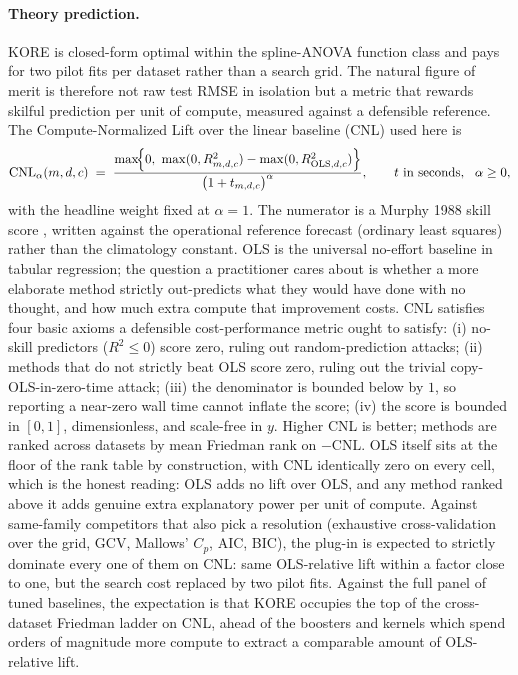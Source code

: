 \documentclass{article}
\newcommand{\KORE}{\textsc{KORE}}
\begin{document}
\paragraph{Theory prediction.}
\KORE{} is closed-form optimal within the spline-ANOVA function class and pays for two pilot fits per dataset rather than a search grid. The natural figure of merit is therefore not raw test RMSE in isolation but a metric that rewards skilful prediction per unit of compute, measured against a defensible reference. The Compute-Normalized Lift over the linear baseline (CNL) used here is
\[
   \mathrm{CNL}_\alpha(m, d, c) \;=\; \frac{\max\!\Bigl\{0,\ \max(0, R^2_{m,d,c}) - \max(0, R^2_{\mathrm{OLS},d,c})\Bigr\}}{\bigl(1 + t_{m,d,c}\bigr)^\alpha}, \qquad t \text{ in seconds},\ \ \alpha \ge 0,
\]
with the headline weight fixed at $\alpha = 1$. The numerator is a Murphy 1988 skill score \citep{murphy1988}, written against the operational reference forecast (ordinary least squares) rather than the climatology constant. OLS is the universal no-effort baseline in tabular regression; the question a practitioner cares about is whether a more elaborate method strictly out-predicts what they would have done with no thought, and how much extra compute that improvement costs. CNL satisfies four basic axioms a defensible cost-performance metric ought to satisfy: (i) no-skill predictors ($R^2 \le 0$) score zero, ruling out random-prediction attacks; (ii) methods that do not strictly beat OLS score zero, ruling out the trivial copy-OLS-in-zero-time attack; (iii) the denominator is bounded below by $1$, so reporting a near-zero wall time cannot inflate the score; (iv) the score is bounded in $[0, 1]$, dimensionless, and scale-free in $y$. Higher CNL is better; methods are ranked across datasets by mean Friedman rank on $-\mathrm{CNL}$. OLS itself sits at the floor of the rank table by construction, with CNL identically zero on every cell, which is the honest reading: OLS adds no lift over OLS, and any method ranked above it adds genuine extra explanatory power per unit of compute. Against same-family competitors that also pick a resolution (exhaustive cross-validation over the grid, GCV, Mallows' $C_p$, AIC, BIC), the plug-in is expected to strictly dominate every one of them on CNL: same OLS-relative lift within a factor close to one, but the search cost replaced by two pilot fits. Against the full panel of tuned baselines, the expectation is that \KORE{} occupies the top of the cross-dataset Friedman ladder on CNL, ahead of the boosters and kernels which spend orders of magnitude more compute to extract a comparable amount of OLS-relative lift.
\end{document}
